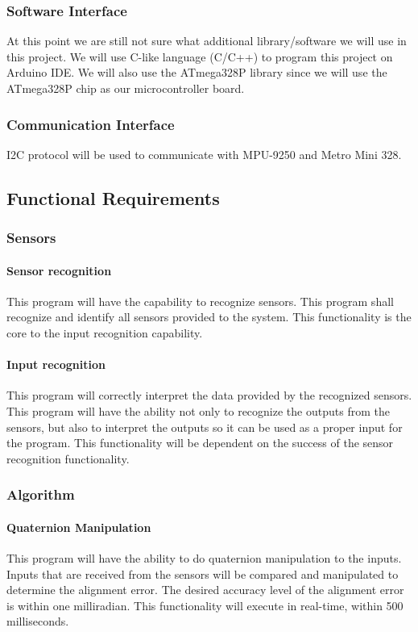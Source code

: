 \subsubsection{Software Interface}
At this point we are still not sure what additional library/software we will use in this project. We will use C-like language (C/C++) to program this project on Arduino IDE. We will also use the ATmega328P library since we will use the ATmega328P chip as our microcontroller board.
\\
\subsubsection{Communication Interface}
I2C protocol will be used to communicate with MPU-9250 and Metro Mini 328. 


\subsection{Functional Requirements}
\subsubsection{Sensors}

\paragraph{Sensor recognition}
This program will have the capability to recognize sensors. This program shall recognize and identify all sensors provided to the system. This functionality is the core to the input recognition capability.
\\
\paragraph{Input recognition}
This program will correctly interpret the data provided by the recognized sensors. This program will have the ability not only to recognize the outputs from the sensors, but also to interpret the outputs so it can be used as a proper input for the program. This functionality will be dependent on the success of the sensor recognition functionality.
\\
\subsubsection{Algorithm}
\paragraph{Quaternion Manipulation}
This program will have the ability to do quaternion manipulation to the inputs. Inputs that are received from the sensors will be compared and manipulated to determine the alignment error. The desired accuracy level of the alignment error is within one milliradian. This functionality will execute in real-time, within 500 milliseconds.
\\
